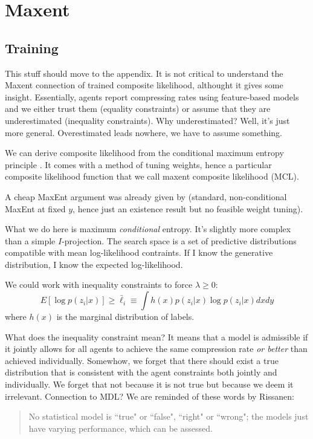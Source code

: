 \documentclass[english]{scrartcl}
\begin{document}
\section{Maxent}

\subsection{Training}
\label{sec:maxent}

{\color{red}This stuff should move to the appendix. It is not critical to understand the Maxent connection of trained composite likelihood, althought it gives some insight. Essentially, agents report compressing rates using feature-based models and we either trust them (equality constraints) or assume that they are underestimated (inequality constraints). Why underestimated? Well, it's just more general. Overestimated leads nowhere, we have to assume something.}

We can derive composite likelihood from the conditional maximum entropy principle \cite{BergerA-96}. It comes with a method of tuning weights, hence a particular composite likelihood function that we call maxent composite likelihood (MCL).

A cheap MaxEnt argument was already given by \cite{Wang-14}  (standard, non-conditional MaxEnt at fixed $y$, hence just an existence result but no feasible weight tuning).

What we do here is maximum {\em conditional} entropy. It's slightly more complex than a simple $I$-projection. The search space is a set of predictive distributions compatible with mean log-likelihood contraints. If I know the generative distribution, I know the expected log-likelihood.

We could work with inequality constraints to force $\lambda\geq 0$:
$$
E[\log p(z_i|x)] \geq \bar{\ell}_i \equiv \int h(x)p(z_i|x) \log p(z_i|x) dx dy
$$
where $h(x)$ is the marginal distribution of labels.

What does the inequality constraint mean? It means that a model is admissible if it jointly allows for all agents to achieve the same compression rate {\em or better} than achieved individually. Somewhow, we forget that there should exist a true distribution that is consistent with the agent constraints both jointly and individually. We forget that not because it is not true but because we deem it irrelevant. Connection to MDL? We are reminded of these words by Rissanen:
\begin{quote}
No statistical model is ``true" or ``false", ``right" or ``wrong"; the models just have varying performance, which can be assessed.  
\end{quote}
\end{document}
